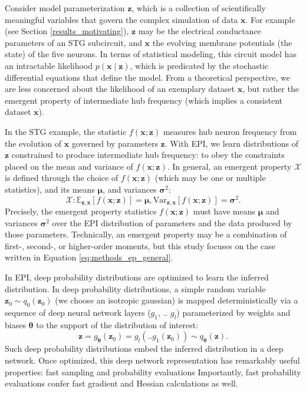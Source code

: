 \documentclass[11pt]{article}
\begin{document}
Consider model parameterization $\mathbf{z}$, which is a collection of scientifically meaningful variables that govern the complex simulation of data $\mathbf{x}$.
For example (see Section \ref{results_motivating}), $\mathbf{z}$ may be the electrical conductance parameters of an STG subcircuit, and $\mathbf{x}$ the evolving membrane potentials (the state) of the five neurons.
In terms of statistical modeling, this circuit model has an intractable likelihood $p(\mathbf{x} \mid \mathbf{z})$, which is predicated by the stochastic differential equations that define the model.
From a theoretical perspective, we are less concerned about the likelihood of an exemplary dataset $\mathbf{x}$, but rather the emergent property of intermediate hub frequency (which implies a consistent dataset $\mathbf{x}$).

In the STG example, the statistic $f(\mathbf{x}; \mathbf{z})$ measures hub neuron frequency from the evolution of $\mathbf{x}$ governed by parameters $\mathbf{z}$.
With EPI, we learn distributions of $\mathbf{z}$ constrained to produce intermediate hub frequency: to obey the constraints placed on the mean and variance of $f(\mathbf{x}; \mathbf{z})$.
In general, an emergent property $\mathcal{X}$ is defined through the choice of $f(\mathbf{x}; \mathbf{z})$ (which may be one or multiple statistics), and its means $\bm{\mu}$, and variances $\bm{\sigma}^2$:
 \begin{equation} \label{eq:methods_ep_general}
\mathcal{X}: \mathbb{E}_{\mathbf{z},\mathbf{x}}\left[f(\mathbf{x}; \mathbf{z})\right] = \bm{\mu}, \text{Var}_{\mathbf{z},\mathbf{x}}\left[f(\mathbf{x}; \mathbf{z})\right] = \bm{\sigma}^2.
\end{equation}
Precisely, the emergent property statistics $f(\mathbf{x}; \mathbf{z})$ must have means $\bm{\mu}$ and variances $\bm{\sigma}^2$  over the EPI distribution of parameters and the data produced by those parameters.
Technically, an emergent property may be a combination of first-, second-, or higher-order moments, but this study focuses on the case written in Equation \ref{eq:methods_ep_general}.

In EPI, deep probability distributions are optimized to learn the inferred distribution.
 In deep probability distributions, a simple random variable $\mathbf{z}_0 \sim q_0(\mathbf{z}_0)$ (we choose an isotropic gaussian) is mapped deterministically via a sequence of deep neural network layers ($g_1$, .. $g_l$) parameterized by weights and biases $\bm{\theta}$ to the support of the distribution of interest:
\begin{equation}
\label{eq:deep_transform}
\mathbf{z} = g_{\bm{\theta}}(\mathbf{z}_0) = g_l(..g_1(\mathbf{z}_0)) \sim q_{\bm{\theta}}(\mathbf{z}).
\end{equation}
Such deep probability distributions embed the inferred distribution in a deep network.
Once optimized, this deep network representation has remarkably useful properties: fast sampling and probability evaluations
Importantly, fast probability evaluations confer fast gradient and Hessian calculations as well.
\end{document}
